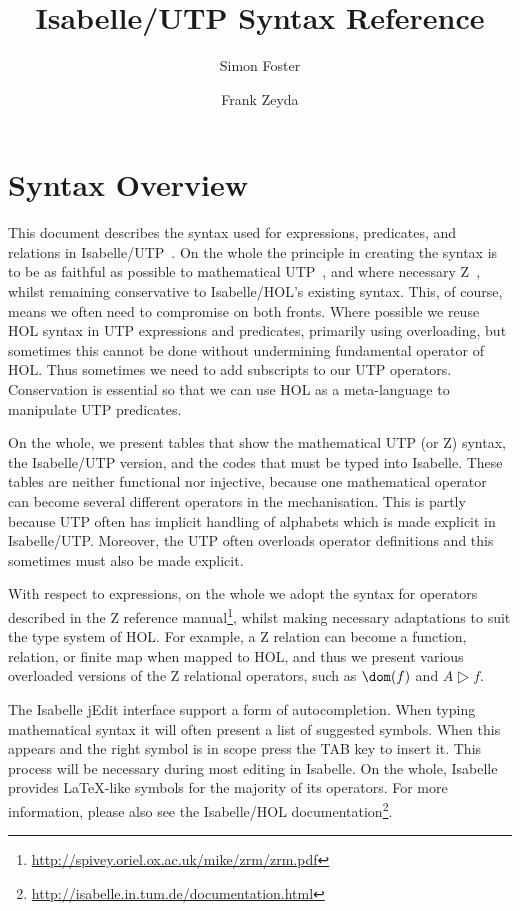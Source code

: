 \documentclass[11pt]{article}
\title{Isabelle/UTP Syntax Reference}
\author{Simon Foster \and Frank Zeyda}
\begin{document}
\maketitle

\vspace{-8ex}

\tableofcontents

\newpage

\section{Syntax Overview}

This document describes the syntax used for expressions, predicates, and relations in Isabelle/UTP~\cite{Foster16a}. On
the whole the principle in creating the syntax is to be as faithful as possible to mathematical
UTP~\cite{Hoare&98,Cavalcanti&06}, and where necessary Z~\cite{Z}, whilst remaining conservative to Isabelle/HOL's
existing syntax. This, of course, means we often need to compromise on both fronts. Where possible we reuse HOL syntax
in UTP expressions and predicates, primarily using overloading, but sometimes this cannot be done without undermining
fundamental operator of HOL. Thus sometimes we need to add subscripts to our UTP operators. Conservation is essential so
that we can use HOL as a meta-language to manipulate UTP predicates.

On the whole, we present tables that show the mathematical UTP (or Z) syntax, the Isabelle/UTP version, and the codes
that must be typed into Isabelle. These tables are neither functional nor injective, because one mathematical operator
can become several different operators in the mechanisation. This is partly because UTP often has implicit handling of
alphabets which is made explicit in Isabelle/UTP. Moreover, the UTP often overloads operator definitions and this
sometimes must also be made explicit.

With respect to expressions, on the whole we adopt the syntax for operators described in the Z reference
manual\footnote{\url{http://spivey.oriel.ox.ac.uk/mike/zrm/zrm.pdf}}, whilst making necessary adaptations to suit the
type system of HOL. For example, a Z relation can become a function, relation, or finite map when mapped to HOL, and
thus we present various overloaded versions of the Z relational operators, such as $\dom(f)$ and $A \rres f$.

The Isabelle jEdit interface support a form of autocompletion. When typing mathematical syntax it will often present a
list of suggested symbols. When this appears and the right symbol is in scope press the TAB key to insert it. This
process will be necessary during most editing in Isabelle. On the whole, Isabelle provides \LaTeX-like symbols for the
majority of its operators. For more information, please also see the Isabelle/HOL
documentation\footnote{\url{http://isabelle.in.tum.de/documentation.html}}.
\end{document}

